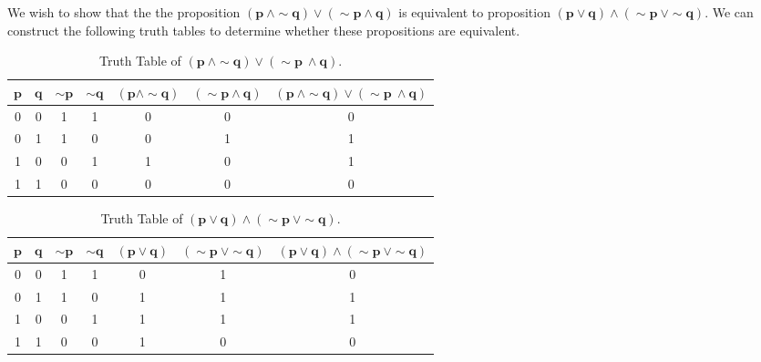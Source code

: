 %
%

\begin{subquestions}


\subquestion

\begin{subsubquestions}
	
\subsubquestion
We wish to show that the the proposition $\boldsymbol{(p ~\land \sim q) \lor (\sim p \land q)}$ is equivalent to proposition $\boldsymbol{(p \lor q) \land (\sim p ~\lor \sim q)}$. We can construct the following truth tables to determine whether these propositions are equivalent.
\begin{table}[H]
	\centering
	\begin{tabular}{|c|c|c|c|c|c|c|}
		\hline
		$\boldsymbol{p}$ & $\boldsymbol{q}$ & $\boldsymbol{\sim p}$ & $\boldsymbol{\sim q}$ & $\boldsymbol{(p \land \sim q)}$ & $\boldsymbol{(\sim p \land q)}$ & $\boldsymbol{(p \ \land \sim q) \lor (\sim p \ \land q)}$ \\
		\hline
		0 & 0 & 1 & 1 & 0 & 0 & 0 \\
		0 & 1 & 1 & 0 & 0 & 1 & 1  \\ 
		1 & 0 & 0 & 1 & 1 & 0 & 1  \\
		1 & 1 & 0 & 0 & 0 & 0 & 0  \\
		\hline
	\end{tabular}
	\caption{\label{2016:q1:tab:TruthTab1} Truth Table of $\boldsymbol{(p ~\land \sim q) \lor (\sim p \ \land q)}$.}
\end{table}

\begin{table}[H]
	\centering
	\begin{tabular}{|c|c|c|c|c|c|c|}
		\hline
		$\boldsymbol{p}$ & $\boldsymbol{q}$ & $\boldsymbol{\sim p}$ & $\boldsymbol{\sim q}$ & $\boldsymbol{(p \lor q)}$ & $\boldsymbol{(\sim p \ \lor \sim q)}$ & $\boldsymbol{(p \lor q) \land (\sim p \ \lor \sim q)}$ \\
		\hline
		0 & 0 & 1 & 1 & 0 & 1 & 0  \\
		0 & 1 & 1 & 0 & 1 & 1 & 1  \\ 
		1 & 0 & 0 & 1 & 1 & 1 & 1  \\
		1 & 1 & 0 & 0 & 1 & 0 & 0  \\
		\hline
	\end{tabular}
	\caption{\label{2016:q1:tab:TruthTab1} Truth Table of $\boldsymbol{(p \lor q) \land (\sim p \ \lor \sim q)}$.}
\end{table}


\end{subsubquestions}
\end{subquestions}
